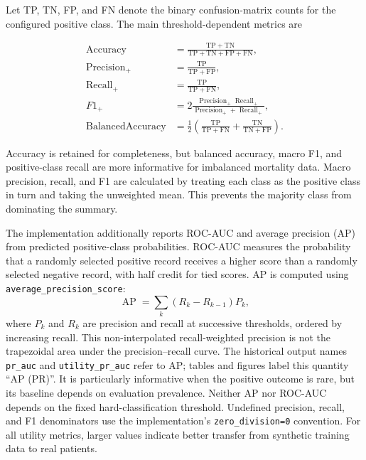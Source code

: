 Let TP, TN, FP, and FN denote the binary confusion-matrix counts for the
configured positive class. The main threshold-dependent metrics are

\begin{align}
    \operatorname{Accuracy} &=
        \frac{\mathrm{TP}+\mathrm{TN}}
             {\mathrm{TP}+\mathrm{TN}+\mathrm{FP}+\mathrm{FN}},
        \label{eq:evaluation_accuracy}\\
    \operatorname{Precision}_{+} &=
        \frac{\mathrm{TP}}{\mathrm{TP}+\mathrm{FP}},
        \label{eq:evaluation_precision}\\
    \operatorname{Recall}_{+} &=
        \frac{\mathrm{TP}}{\mathrm{TP}+\mathrm{FN}},
        \label{eq:evaluation_recall}\\
    F1_{+} &=
        2\frac{\operatorname{Precision}_{+}\operatorname{Recall}_{+}}
        {\operatorname{Precision}_{+}+\operatorname{Recall}_{+}},
        \label{eq:evaluation_f1}\\
    \operatorname{BalancedAccuracy} &=
        \frac{1}{2}\left(
        \frac{\mathrm{TP}}{\mathrm{TP}+\mathrm{FN}}+
        \frac{\mathrm{TN}}{\mathrm{TN}+\mathrm{FP}}\right).
        \label{eq:evaluation_balanced_accuracy}
\end{align}

Accuracy is retained for completeness, but balanced accuracy, macro F1, and
positive-class recall are more informative for imbalanced mortality data.
Macro precision, recall, and F1 are calculated by treating each class as the
positive class in turn and taking the unweighted mean. This prevents the
majority class from dominating the summary.

The implementation additionally reports ROC-AUC and average precision (AP) from predicted
positive-class probabilities. ROC-AUC measures the probability that a randomly
selected positive record receives a higher score than a randomly selected
negative record, with half credit for tied scores. AP is computed using
\texttt{average\_precision\_score}:
\begin{equation*}
    \operatorname{AP}=\sum_{k}(R_k-R_{k-1})P_k,
\end{equation*}
where $P_k$ and $R_k$ are precision and recall at successive thresholds,
ordered by increasing recall. This non-interpolated recall-weighted
precision is not the trapezoidal area under the precision--recall curve.
The historical output names \texttt{pr\_auc} and \texttt{utility\_pr\_auc}
refer to AP; tables and figures label this quantity ``AP (PR)''.
It is particularly informative when the positive outcome is rare, but its
baseline depends on evaluation prevalence. Neither AP nor ROC-AUC depends on
the fixed hard-classification threshold. Undefined precision, recall, and F1
denominators use the implementation's \texttt{zero\_division=0} convention.
For all utility
metrics, larger values indicate better transfer from synthetic training data
to real patients.

